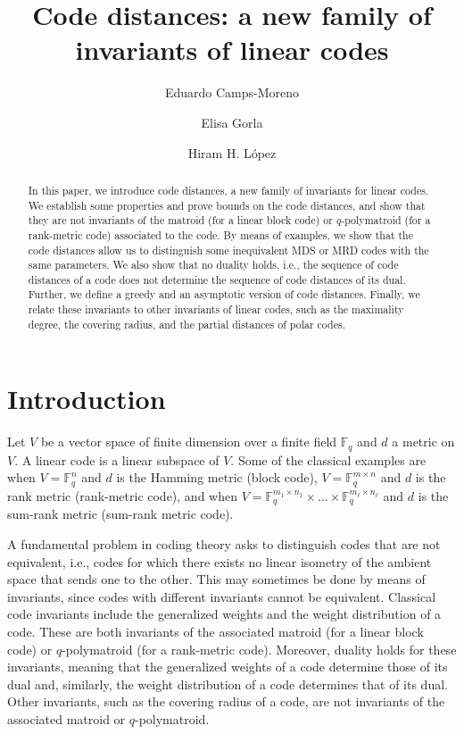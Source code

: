 \documentclass[12pt]{amsart}
\title{Code distances: a new family of invariants of linear codes}
\author{Eduardo Camps-Moreno}
\author{Elisa Gorla}
\author{Hiram H. L\'opez}
\numberwithin{equation}{section}
\theoremstyle{definition}
\newcommand{\FF}{\mathbb{F}}
\begin{document}
\begin{abstract}
In this paper, we introduce code distances, a new family of invariants for linear codes. We establish some properties and prove bounds on the code distances, and show that they are not invariants of the matroid (for a linear block code) or $q$-polymatroid (for a rank-metric code) associated to the code. By means of examples, we show that the code distances allow us to distinguish some inequivalent MDS or MRD codes with the same parameters. We also show that no duality holds, i.e., the sequence of code distances of a code does not determine the sequence of code distances of its dual. Further, we define a greedy and an asymptotic version of code distances. Finally, we relate these invariants to other invariants of linear codes, such as the maximality degree, the covering radius,  and the partial distances of polar codes.
\end{abstract}

\maketitle



\section{Introduction}

Let $V$ be a vector space of finite dimension over a finite field $\FF_q$ and $d$ a metric on $V$. A linear code is a linear subspace of $V$. Some of the classical examples are when $V = \FF_q^n$ and $d$ is the Hamming metric (block code), $V=\mathbb{F}_q^{m\times n}$ and $d$ is the rank metric (rank-metric code), and when $V=\mathbb{F}_q^{m_1\times n_1}\times\ldots\times\FF_q^{m_\ell\times n_\ell}$ and $d$ is the sum-rank metric (sum-rank metric code). 

A fundamental problem in coding theory asks to distinguish codes that are not equivalent, i.e., codes for which there exists no linear isometry of the ambient space that sends one to the other.
This may sometimes be done by means of invariants, since codes with different invariants cannot be equivalent. Classical code invariants include the generalized weights and the weight distribution of a code. These are both invariants of the associated matroid (for a linear block code) or $q$-polymatroid (for a rank-metric code). Moreover,  duality holds for these invariants, meaning that the generalized weights of a code determine those of its dual and, similarly, the weight distribution of a code determines that of its dual. Other invariants, such as the covering radius of a code, are not invariants of the associated matroid or $q$-polymatroid.
\end{document}

